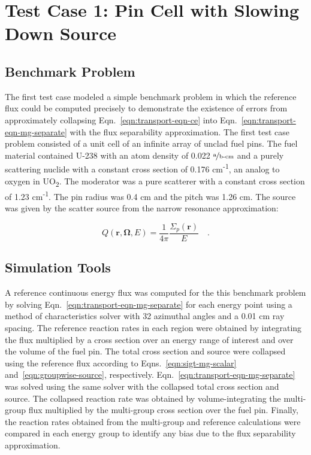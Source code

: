 \section{Test Case 1: Pin Cell with Slowing Down Source}
\label{sec:test-case1}

\subsection{Benchmark Problem}
\label{subsec:benchmark-case1}

The first test case modeled a simple benchmark problem in which the reference flux could be computed precisely to demonstrate the existence of errors from approximately collapsing Eqn.~\ref{eqn:transport-eqn-ce} into Eqn.~\ref{eqn:transport-eqn-mg-separate} with the flux separability approximation. The first test case problem consisted of a unit cell of an infinite array of unclad fuel pins. The fuel material contained U-238 with an atom density of 0.022 $\nicefrac{\text{a}}{\text{b-cm}}$ and a purely scattering nuclide with a constant cross section of 0.176 cm\textsuperscript{-1}, an analog to oxygen in UO\textsubscript{2}. The moderator was a pure scatterer with a constant cross section of 1.23 cm\textsuperscript{-1}. The pin radius was 0.4 cm and the pitch was 1.26 cm. The source was given by the scatter source from the narrow resonance approximation:

\begin{dmath}
\label{eqn:test-source-ce}
Q(\mathbf{r},\mathbf{\Omega},E) = \frac{1}{4\pi} \frac{\Sigma_{p}(\mathbf{r})}{E} \quad .
\end{dmath}


\subsection{Simulation Tools}
\label{subsec:sim-tools-case1}

A reference continuous energy flux was computed for the this benchmark problem by solving Eqn.~\ref{eqn:transport-eqn-mg-separate} for each energy point using a method of characteristics solver with 32 azimuthal angles and a 0.01 cm ray spacing. The reference reaction rates in each region were obtained by integrating the flux multiplied by a cross section over an energy range of interest and over the volume of the fuel pin. The total cross section and source were collapsed using the reference flux according to Eqns.~\ref{eqn:sigt-mg-scalar} and~\ref{eqn:groupwise-source}, respectively. Eqn.~\ref{eqn:transport-eqn-mg-separate} was solved using the same solver with the collapsed total cross section and source. The collapsed reaction rate was obtained by volume-integrating the multi-group flux multiplied by the multi-group cross section over the fuel pin. Finally, the reaction rates obtained from the multi-group and reference calculations were compared in each energy group to identify any bias due to the flux separability approximation.

